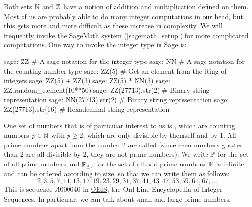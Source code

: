Both sets $\mathbb{N}$ and $\mathbb{Z}$ have a notion of addition and multiplication defined on them. Most of us are probably able to do many integer computations in our head, but this gets more and more difficult as these increase in complexity.  We will frequently invoke the SageMath system (\ref{sagemath_setup}) for more complicated computations. One way to invoke the integer type in Sage is: 
\begin{sagecommandline}
sage: ZZ # A sage notation for the integer type
sage: NN # A sage notation for the counting number type
sage: ZZ(5) # Get an element from the Ring of integers
sage: ZZ(5) + ZZ(3)
sage: ZZ(5) * NN(3)
sage: ZZ.random_element(10**50)
sage: ZZ(27713).str(2) # Binary string representation
sage: NN(27713).str(2) # Binary string representation
sage: ZZ(27713).str(16) # Hexadecimal string representation
\end{sagecommandline}
One set of numbers that is of particular interest to us is , which are counting numbers $ p \in \mathbb{N} $ with $ p \geq 2 $, which are only divisible by themself and by $ 1 $. All prime numbers apart from the number $ 2 $ are called  (since even numbers greater than $2$ are all divisible by $2$, they are not prime numbers). We write $ \mathbb{P} $ for the set of all prime numbers and $ \mathbb{P} _{\geq 3} $ for the set of all odd prime numbers.
$\mathbb{P}$ is infinite and can be ordered according to size, so that we can write them as follows:
\begin{equation}
\label{eq: primenumber_sequence}
2, 3, 5, 7, 11, 13, 17, 19, 23, 29, 31, 37, 41, 43, 47, 53, 59, 61, 67, \ldots
\end{equation}
This is sequence $ A000040 $ in \href{https://oeis.org/}{OEIS}, the Onl-Line Encyclopedia of Integer Sequences. In particular, we can talk about small and large prime numbers.

